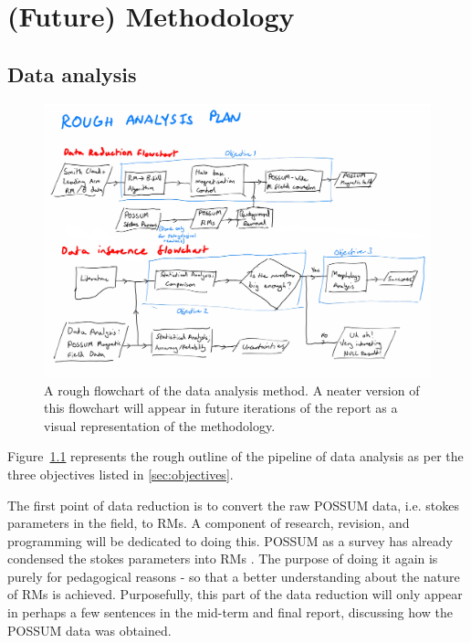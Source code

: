 \chapter{(Future) Methodology}
\label{cha:methodology}

\section{Data analysis}
\label{sec:method}

\begin{figure}[h]
  \label{fig:flowchart}
  \includegraphics[width=\columnwidth]{figs/flowchart.png}
  \caption{A rough flowchart of the data analysis method. A neater version of this flowchart will appear in future iterations of the report as a visual representation of the methodology.}
\end{figure}

Figure~\ref{fig:flowchart} represents the rough outline of the pipeline of data analysis as per the three objectives listed in \ref{sec:objectives}.

The first point of data reduction is to convert the raw POSSUM data, i.e. stokes parameters in the field, to RMs. A component of research, revision, and programming will be dedicated to doing this. POSSUM as a survey has already condensed the stokes parameters into RMs \cite{ID1}. The purpose of doing it again is purely for pedagogical reasons - so that a better understanding about the nature of RMs is achieved. Purposefully, this part of the data reduction will only appear in perhaps a few sentences in the mid-term and final report, discussing how the POSSUM data was obtained.

